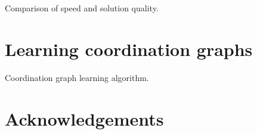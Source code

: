 \documentclass[a4paper, 12pt]{article}
\begin{document}
\begin{table*}[tp]
  \centering
  
  \caption{Comparison of speed and solution quality.}
  \label{tab:part1}
\end{table*}



\section{Learning coordination graphs}

\begin{algorithm}[tph]
  \caption{Coordination graph learning algorithm.}
  \label{alg:LCG}
  \begin{algorithmic}
    
    \EndFunction
  \end{algorithmic}
\end{algorithm}





\section{Acknowledgements}

\footnotesize


\end{document}
